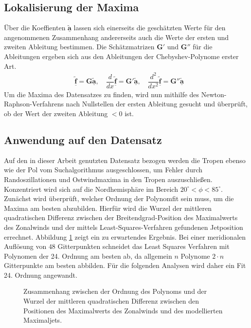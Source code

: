 \subsection{Lokalisierung der Maxima}
Über die Koeffienten $\underline{\boldsymbol{\tilde{a}}}$ lassen sich einerseits die geschätzten Werte für den angenommenen Zusammenhang andererseits auch die Werte der ersten und zweiten Ableitung bestimmen. Die Schätzmatrizen $\boldsymbol{G}'$ und $\boldsymbol{G}''$ für die Ableitungen ergeben sich aus den Ableitungen der Chebyshev-Polynome erster Art.
\begin{align}
& \underline{\boldsymbol{\tilde{f}}} = \boldsymbol{G}\underline{\boldsymbol{\tilde{a}}}, \hspace{1em} \dfrac{d}{dx}\underline{\boldsymbol{\tilde{f}}} = \boldsymbol{G}'\underline{\boldsymbol{\tilde{a}}}, \hspace{1em} \dfrac{d^2}{dx^2}\underline{\boldsymbol{\tilde{f}}} = \boldsymbol{G}''\underline{\boldsymbol{\tilde{a}}}
\end{align}
Um die Maxima des Datensatzes zu finden, wird nun mithilfe des Newton-Raphson-Verfahrens nach Nullstellen der ersten Ableitung gesucht und überprüft, ob der Wert der zweiten Ableitung $<0$ ist.


\subsection{Anwendung auf den Datensatz}
Auf den in dieser Arbeit genutzten Datensatz bezogen werden die Tropen ebenso wie der Pol vom Suchalgorithmus ausgeschlossen, um Fehler durch Randoszillationen und Ostwindmaxima in den Tropen auszuschließen. Konzentriert wird sich auf die Nordhemisphäre im Bereich $20^{\circ} < \phi < 85^{\circ}$. Zunächst wird überprüft, welcher Ordnung der Polynomfit sein muss, um die Maxima am besten abzubilden. Hierfür wird die Wurzel der mittleren quadratischen Differenz zwischen der Breitendgrad-Position des Maximalwerts des Zonalwinds und der mittels Least-Squares-Verfahren gefundenen Jetposition errechnet. Abbildung \ref{fig:order_rmse} zeigt ein zu erwartendes Ergebnis. Bei einer meridionalen Auflösung von $48$ Gitterpunkten schneidet das Least Squares Verfahren mit Polynomen der 24. Ordnung am besten ab, da allgemein $n$ Polynome $2 \cdot n$ Gitterpunkte am besten abbilden. Für die folgenden Analysen wird daher ein Fit 24. Ordnung angewandt. 

\begin{figure}
  \centering
  \caption{Zusammenhang zwischen der Ordnung des Polynoms und der Wurzel der mittleren quadratischen Differenz zwischen den Positionen des Maximalwerts des Zonalwinds und des modellierten Maximaljets.} \label{fig:order_rmse}
\end{figure}

